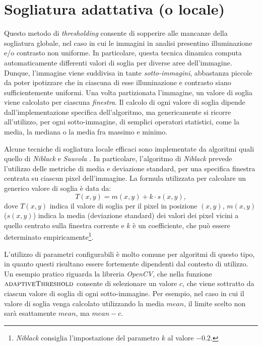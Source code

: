 \section{Sogliatura adattativa (o locale)}
\label{sec:image-bin-local}
Questo metodo di \textit{thresholding} consente di sopperire alle mancanze della sogliatura globale, nel caso in cui le immagini in analisi presentino illuminazione e/o contrasto non uniforme. In particolare, questa tecnica dinamica computa automaticamente differenti valori di soglia per diverse aree dell'immagine. Dunque, l'immagine viene suddivisa in tante \textit{sotto-immagini}, abbastanza piccole da poter ipotizzare che in ciascuna di esse illuminazione e contrasto siano sufficientemente uniformi. Una volta partizionata l'immagine, un valore di soglia viene calcolato per ciascuna \textit{finestra}. Il calcolo di ogni valore di soglia dipende dall'implementazione specifica dell'algoritmo, ma genericamente si ricorre all'utilizzo, per ogni sotto-immagine, di semplici operatori statistici, come la media, la mediana o la media fra massimo e minimo.\par
Alcune tecniche di sogliatura locale efficaci sono implementate da algoritmi quali quello di \textit{Niblack} \cite{bib:niblack} e \textit{Sauvola} \cite{bib:sauvola}. In particolare, l'algoritmo di \textit{Niblack} prevede l'utilizzo delle metriche di media e deviazione standard, per una specifica finestra centrata su ciascun pixel dell'immagine. La formula utilizzata per calcolare un generico valore di soglia \`e data da:
\begin{equation}
	\label{eq:niblack}
	T(x, y) = m(x, y) + k \cdot s(x, y),
\end{equation}
dove $T(x, y)$ indica il valore di soglia per il pixel in posizione $(x, y)$, $m(x, y)$ ($s(x, y)$) indica la media (deviazione standard) dei valori dei pixel vicini a quello centrato sulla finestra corrente e $k$ \`e un coefficiente, che pu\`o essere determinato empiricamente\footnote{\textit{Niblack} consiglia l'impostazione del parametro $k$ al valore $-0.2$.}.\par
L'utilizzo di parametri configurabili \`e molto comune per algoritmi di questo tipo, in quanto questi risultano essere fortemente dipendenti dal contesto di utilizzo. Un esempio pratico riguarda la libreria \textit{OpenCV}, che nella funzione $\textproc{adaptiveThreshold}$ consente di selezionare un valore $c$, che viene sottratto da ciascun valore di soglia di ogni sotto-immagine. Per esempio, nel caso in cui il valore di soglia venga calcolato utilizzando la media $mean$, il limite scelto non sar\`a esattamente $mean$, ma $mean - c$.\par
